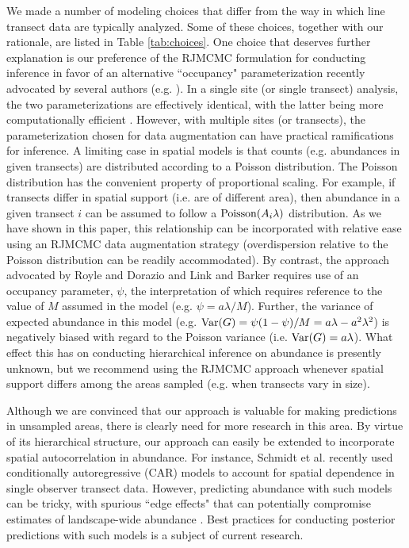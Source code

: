 \documentclass[10pt]{article}
\begin{document}
We made a number of modeling choices that differ from the way in which line transect data are typically analyzed. Some of these choices, together with our rationale, are listed in Table \ref{tab:choices}.  One choice that deserves further explanation is our preference of the RJMCMC formulation for conducting inference in favor of an alternative ``occupancy" parameterization recently advocated by several authors (e.g. \cite{RoyleDorazio2008,LinkBarker2010}).  In a single site (or single transect) analysis, the two parameterizations are effectively identical, with the latter being more computationally efficient \cite{LinkBarker2010}.  However, with multiple sites (or transects), the parameterization chosen for data augmentation can have practical ramifications for inference.  A limiting case in spatial models is that counts (e.g. abundances in given transects) are distributed according to a Poisson distribution.  The Poisson distribution has the convenient property of proportional scaling.  For example, if transects differ in spatial support (i.e. are of different area), then abundance in a given transect $i$ can be assumed to follow a ${\rm Poisson}(A_i\lambda)$ distribution.  As we have shown in this paper, this relationship can be incorporated with relative ease using an RJMCMC data augmentation strategy (overdispersion relative to the Poisson distribution can be readily accommodated). By contrast, the approach advocated by Royle and Dorazio \cite{RoyleDorazio2008} and Link and Barker \cite{LinkBarker2010} requires use of an occupancy parameter, $\psi$, the interpretation of which requires reference to the value of $M$ assumed in the model (e.g. $\psi=a\lambda/M$).  Further, the variance of expected abundance in this model (e.g. ${\rm Var}(G)=\psi (1-\psi)/M = a\lambda-a^2\lambda^2$) is negatively biased with regard to the Poisson variance (i.e. ${\rm Var}(G)=a\lambda$).  What effect this has on conducting hierarchical inference on abundance is presently unknown, but we recommend using the RJMCMC approach whenever spatial support differs among the areas sampled (e.g. when transects vary in size).

Although we are convinced that our approach is valuable for making predictions in unsampled areas, there is clearly need for more research in this area.  By virtue of its hierarchical structure, our approach can easily be extended to incorporate spatial autocorrelation in abundance.  For instance, Schmidt et al. \cite{SchmidtEtAl2012} recently used conditionally autoregressive (CAR) models to account for spatial dependence in single observer transect data.  However, predicting abundance with such models can be tricky, with spurious ``edge effects" that can potentially compromise estimates of landscape-wide abundance \cite{VerHoefJansen2007}.  Best practices for conducting posterior predictions with such models is a subject of current research.
\end{document}
